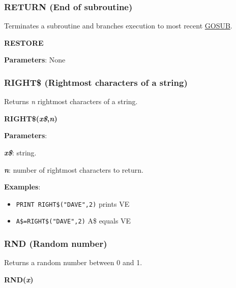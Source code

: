     \subsubsection{{RETURN (End of subroutine)}}
    \label{msbasic:lang:return}
    Terminates a subroutine and branches execution to most recent
    \hyperref[msbasic:lang:gosub]{GOSUB}.

    \hspace{1.9cm}\textbf{RESTORE}

    \textbf{Parameters}: None

    \subsubsection{{RIGHT\$ (Rightmost characters of a string)}}
    \label{msbasic:lang:right}
    Returns \textit{n} rightmost characters of a string.

    \hspace{1.9cm}\textbf{RIGHT\$(\textit{x\$},\textit{n})}

    \textbf{Parameters}:

    \hspace{1cm}\textbf{\textit{x\$}}: string.

    \hspace{1cm}\textbf{\textit{n}}: number of rightmost characters to return.

    \textbf{Examples}:
    \begin{itemize}
        \item \texttt{PRINT RIGHT\$("DAVE",2)} prints VE
        \item \texttt{A\$=RIGHT\$("DAVE",2)} A\$ equals VE
    \end{itemize}

    \subsubsection{{RND (Random number)}}
    \label{msbasic:lang:rnd}
    Returns a random number between 0 and 1.

    \hspace{1.9cm}\textbf{RND(\textit{x})}

